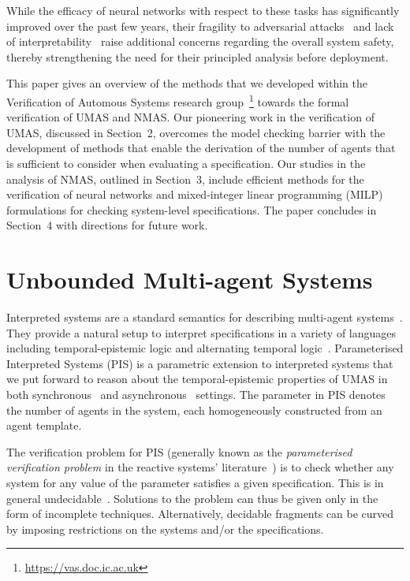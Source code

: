 \documentclass{article}
\begin{document}
While the efficacy of neural networks with respect to these tasks has
significantly improved over the past few years,  their fragility to adversarial
attacks~\cite{Szegedy+14} and lack of interpretability~\cite{VelizKim17} raise 
additional concerns regarding the overall system safety, thereby strengthening
the need for their principled analysis before deployment.

This paper gives an overview of the methods that we developed within the
Verification of Automous Systems research
group~\footnote{\url{https://vas.doc.ic.ac.uk}} towards the formal verification
of UMAS and NMAS.  Our pioneering work in the verification of UMAS, discussed in
Section~2, overcomes the model checking barrier with the development of methods
that enable the derivation of the number of agents that is sufficient to
consider when evaluating a specification. Our studies in the analysis of NMAS,
outlined in Section~3, include efficient methods for the verification of neural
networks and mixed-integer linear programming (MILP) formulations for checking
system-level specifications.  The paper concludes in Section~4 with directions
for future work.


\section{Unbounded Multi-agent Systems}

Interpreted systems are a standard semantics for describing multi-agent
systems~\cite{Fagin+95a}.  They provide a natural setup to interpret
specifications in a variety of languages including temporal-epistemic logic and
alternating temporal logic~\cite{Fagin+95b,LomuscioRaimondi06c}. Parameterised
Interpreted Systems (PIS)  is a parametric extension to interpreted systems
that we put forward  to reason about the temporal-epistemic properties of UMAS
in both synchronous~\cite{KouvarosLomuscio15b} and
asynchronous~\cite{KouvarosLomuscio16a} settings.   The parameter in PIS denotes
the number of agents in the system, each homogeneously constructed from an agent
template. 

The verification problem for PIS (generally known as the {\em parameterised
verification problem} in the reactive systems' literature~\cite{Bloem+15}) is to
check whether any system for any value of the parameter satisfies a given
specification.  This is in general undecidable~\cite{KouvarosLomuscio16a}.
Solutions to the problem can thus be given only in the form of incomplete techniques.
Alternatively, decidable fragments can be curved by imposing
restrictions on the systems and/or the specifications.  
\end{document}
